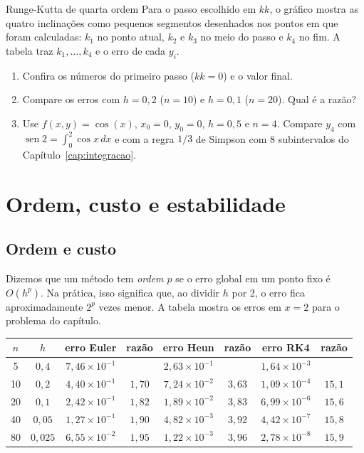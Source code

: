 \begin{atividade}{Runge-Kutta de quarta ordem}{\arqRKquatro}
Para o passo escolhido em $kk$, o gráfico mostra as quatro inclinações como pequenos segmentos
desenhados nos pontos em que foram calculadas: $k_1$ no ponto atual, $k_2$ e $k_3$ no meio do
passo e $k_4$ no fim. A tabela traz $k_1,\dots,k_4$ e o erro de cada $y_i$.
\begin{enumerate}[nosep]
  \item Confira os números do primeiro passo ($kk=0$) e o valor final.
  \item Compare os erros com $h=0{,}2$ ($n=10$) e $h=0{,}1$ ($n=20$). Qual é a razão?
  \item Use $f(x,y)=\cos(x)$, $x_0=0$, $y_0=0$, $h=0{,}5$ e $n=4$. Compare $y_4$ com
        $\operatorname{sen}2=\int_0^2\cos x\,dx$ e com a regra $1/3$ de Simpson com 8
        subintervalos do Capítulo~\ref{cap:integracao}.
\end{enumerate}
\end{atividade}

\section{Ordem, custo e estabilidade}\label{sec:estab}

\subsection{Ordem e custo}

Dizemos que um método tem \emph{ordem $p$} se o erro global em um ponto fixo é $O(h^p)$. Na
prática, isso significa que, ao dividir $h$ por 2, o erro fica aproximadamente $2^p$ vezes
menor. A tabela mostra os erros em $x=2$ para o problema do capítulo.

\begin{center}
\renewcommand{\arraystretch}{1.3}
\begin{tabular}{c|c|cc|cc|cc}
$n$ & $h$ & erro Euler & razão & erro Heun & razão & erro RK4 & razão\\ \hline
5 & $0{,}4$ & $7{,}46\times10^{-1}$ & & $2{,}63\times10^{-1}$ & & $1{,}64\times10^{-3}$ & \\
10 & $0{,}2$ & $4{,}40\times10^{-1}$ & $1{,}70$ & $7{,}24\times10^{-2}$ & $3{,}63$ & $1{,}09\times10^{-4}$ & $15{,}1$\\
20 & $0{,}1$ & $2{,}42\times10^{-1}$ & $1{,}82$ & $1{,}89\times10^{-2}$ & $3{,}83$ & $6{,}99\times10^{-6}$ & $15{,}6$\\
40 & $0{,}05$ & $1{,}27\times10^{-1}$ & $1{,}90$ & $4{,}82\times10^{-3}$ & $3{,}92$ & $4{,}42\times10^{-7}$ & $15{,}8$\\
80 & $0{,}025$ & $6{,}55\times10^{-2}$ & $1{,}95$ & $1{,}22\times10^{-3}$ & $3{,}96$ & $2{,}78\times10^{-8}$ & $15{,}9$
\end{tabular}
\end{center}

